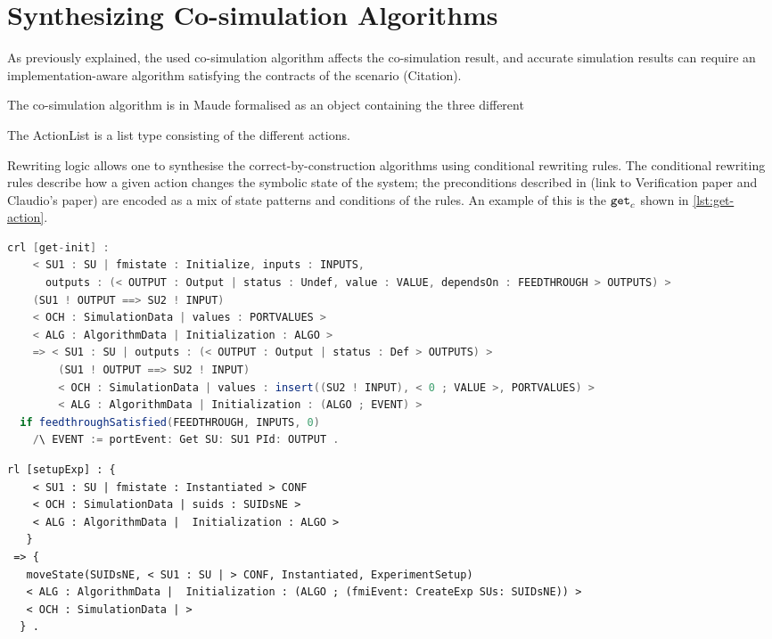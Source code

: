 \section{Synthesizing Co-simulation Algorithms}
As previously explained, the used co-simulation algorithm affects the co-simulation result, and accurate simulation results can require an implementation-aware algorithm satisfying the contracts of the scenario (Citation).

The co-simulation algorithm is in Maude formalised as an object containing the three different 

The ActionList is a list type consisting of the different actions.

Rewriting logic allows one to synthesise the correct-by-construction algorithms using conditional rewriting rules.
The conditional rewriting rules describe how a given action changes the symbolic state of the system; the preconditions described in (link to Verification paper and Claudio's paper) are encoded as a mix of state patterns and conditions of the rules.
An example of this is the $\mathtt{get}_{c}$ shown in \ref{lst:get-action}.

\begin{lstlisting}[caption={The get-action rewriting rule.},label={lst:get-action},language=Java]
    crl [get-init] :
    < SU1 : SU | fmistate : Initialize, inputs : INPUTS, 
      outputs : (< OUTPUT : Output | status : Undef, value : VALUE, dependsOn : FEEDTHROUGH > OUTPUTS) > 
    (SU1 ! OUTPUT ==> SU2 ! INPUT)
    < OCH : SimulationData | values : PORTVALUES > 
    < ALG : AlgorithmData | Initialization : ALGO >
    => < SU1 : SU | outputs : (< OUTPUT : Output | status : Def > OUTPUTS) > 
        (SU1 ! OUTPUT ==> SU2 ! INPUT)
        < OCH : SimulationData | values : insert((SU2 ! INPUT), < 0 ; VALUE >, PORTVALUES) >  
        < ALG : AlgorithmData | Initialization : (ALGO ; EVENT) >
  if feedthroughSatisfied(FEEDTHROUGH, INPUTS, 0)
    /\ EVENT := portEvent: Get SU: SU1 PId: OUTPUT . 
\end{lstlisting}

\begin{lstlisting}
rl [setupExp] : { 
    < SU1 : SU | fmistate : Instantiated > CONF
    < OCH : SimulationData | suids : SUIDsNE > 
    < ALG : AlgorithmData |  Initialization : ALGO > 
   }
 => { 
   moveState(SUIDsNE, < SU1 : SU | > CONF, Instantiated, ExperimentSetup)
   < ALG : AlgorithmData |  Initialization : (ALGO ; (fmiEvent: CreateExp SUs: SUIDsNE)) > 
   < OCH : SimulationData | > 
  } .
\end{lstlisting}

